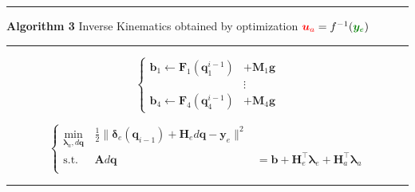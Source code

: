 \documentclass[varwidth, border=1pt]{standalone}
\begin{document}
\begin{minipage}{0.95\linewidth}
\hrule
\vspace{0.3em}
{\bfseries Algorithm 3} Inverse Kinematics obtained by optimization $\textcolor{red}{\bm{u}_a} = f^{-1}(\textcolor{green!50!black}{\bm{y}_e})$
\vspace{0.3em}
\hrule
\vspace{0.5em}

\begin{algorithmic}[1]

    \[
    \left\{
    \begin{aligned}
   \bm{b}_1 \leftarrow \bm{F}_1(\bm{q}_1^{i-1}) &+ \bm{M}_1 \bm{g} \\
    &\vdots \\
   \bm{b}_4 \leftarrow \bm{F}_4(\bm{q}_4^{i-1}) &+ \bm{M}_4 \bm{g}
    \end{aligned}
    \right.
    \]

    \[
    \left\{
    \begin{aligned}
      \min_{\bm{\lambda}_a,d\bm{q}} \, & \frac{1}{2}\| \bm{\delta}_e(\bm{q}_{i-1}) + \bm{H}_e d\bm{q} - \bm{y}_e\|^2 \\
      \text{s.t. } & \bm{A}d\bm{q} &= \bm{b} + \bm{H}_e^\top\bm{\lambda}_e + \bm{H}_a^\top\bm{\lambda}_a \\
    \end{aligned}
    \right.
    \tag{20}
    \]

    \EndIf{}
\EndFor%

\end{algorithmic}
\vspace{0.3em}
\hrule
\end{minipage}
\end{document}
